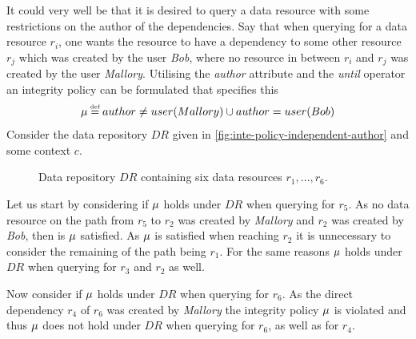 \begin{example}
It could very well be that it is desired to query a data resource with some restrictions on the author of the dependencies. Say that when querying for a data resource $r_i$, one wants the resource to have a dependency to some other resource $r_j$ which was created by the user \emph{Bob}, where no resource in between $r_i$ and $r_j$ was created by the user \emph{Mallory}. Utilising the \emph{author} attribute and the \emph{until} operator an integrity policy can be formulated that specifies this
\begin{align*}
    \inte \eqdef author \neq user(Mallory) \U author = user(Bob)
\end{align*}
Consider the data repository $DR$ given in \autoref{fig:inte-policy-independent-author} and some context $c$.
\begin{figure}[!ht]
    \begin{center}
        
        \caption{Data repository $DR$ containing six data resources $r_1, \ldots, r_6$.}
        \label{fig:inte-policy-independent-author}
    \end{center}
\end{figure}
Let us start by considering if $\mu$ holds under $DR$ when querying for $r_5$. As no data resource on the path from $r_5$ to $r_2$ was created by \emph{Mallory} and $r_2$ was created by \emph{Bob}, then is $\mu$ satisfied. As $\mu$ is satisfied when reaching $r_2$ it is unnecessary to consider the remaining of the path being $r_1$. For the same reasons $\mu$ holds under $DR$ when querying for $r_3$ and $r_2$ as well.

Now consider if $\mu$ holds under $DR$ when querying for $r_6$. As the direct dependency $r_4$ of $r_6$ was created by \emph{Mallory} the integrity policy $\mu$ is violated and thus $\mu$ does not hold under $DR$ when querying for $r_6$, as well as for $r_4$.
\end{example}

